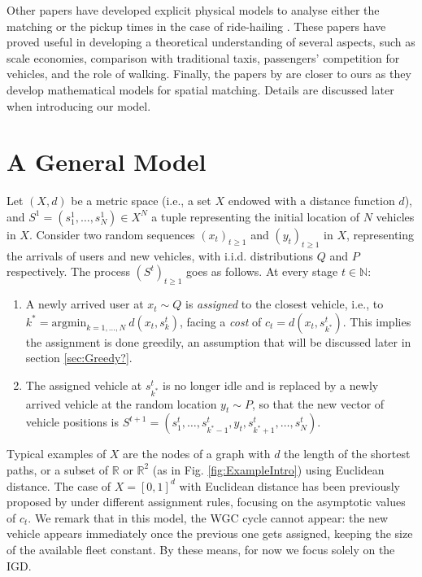 \documentclass[12pt,english]{article}
\begin{document}
Other papers have developed explicit physical models to analyse either the matching or the pickup times in the case of ride-hailing \citep{zhang2019efficiency,zhang2025walking,zha2016economic,yang2020optimizing,li2024aggregate}. These papers have proved useful in developing a theoretical understanding of several aspects, such as scale economies, comparison with traditional taxis, passengers' competition for vehicles, and the role of walking.
Finally, the papers by \cite{kanoria2021dynamic,balkanski2023power} are closer to ours as they develop mathematical models for spatial matching. Details are discussed later when introducing our model.

\section{A General Model}\label{sec:Model}

Let $(X,d)$ be a metric space (i.e., a set $X$ endowed with a distance function $d$), and $S^1=(s^1_1,\ldots,s^1_N) \in X^N$ a tuple representing the initial location of $N$ vehicles in $X$. Consider two random sequences $(x_t)_{t\geq 1}$ and $ (y_t)_{t\geq 1}$ in $X$, representing the arrivals of users and new vehicles, with   i.i.d. distributions $Q$ and $P$ respectively. The process $(S^t)_{t\ge 1}$ goes as follows. At every stage $t \in \mathbb{N}$:
\begin{enumerate}
    \item A newly arrived user at $x_t\sim Q$ is \textit{assigned} to the closest vehicle, i.e., to $k^*=\text{argmin}_{k=1,\ldots,N}~d(x_t,s^t_k)$, facing a \textit{cost} of $c_t=d(x_t,s^t_{k^*})$. This implies the assignment is done greedily, an assumption that will be discussed later in section \ref{sec:Greedy?}.
    \item The assigned vehicle at $s^t_{k^*}$ is no longer idle and is replaced by a newly arrived vehicle at the random location $y_t\sim P$, so that 
     the new vector of vehicle positions is $S^{t+1}=(s^t_1,\ldots,s^t_{k^*-1}, y_t,s^t_{k^*+1},\ldots,s^t_N)$.
\end{enumerate}

\noindent Typical examples of $X$ are the nodes of a graph with $d$ the length of the shortest paths, or a subset of $\mathbb{R}$ or $\mathbb{R}^2$ (as in Fig. \ref{fig:ExampleIntro}) using Euclidean distance. The case of $X=[0,1]^d$ with Euclidean distance has been previously proposed by \cite{kanoria2021dynamic} under different assignment rules, focusing on the asymptotic values of $c_t$. We remark that in this model, the WGC cycle cannot appear: the new vehicle appears immediately once the previous one gets assigned, keeping the size of the available fleet constant. By these means, for now we focus solely on the IGD.
\end{document}
